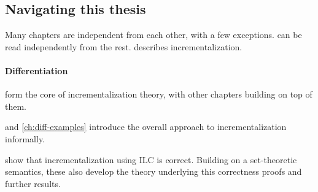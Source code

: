 



\subsection{Navigating this thesis}
Many chapters are independent from each other, with a few exceptions.
 can be read independently from the rest.
 describes incrementalization.

\paragraph{Differentiation}
 form the core of incrementalization
theory, with other chapters building on top of them.

 and \cref{ch:diff-examples} introduce the overall approach to
incrementalization informally.

 show that incrementalization using
ILC is correct. Building on a set-theoretic semantics, these
 also develop the theory
underlying this correctness proofs and further results.

